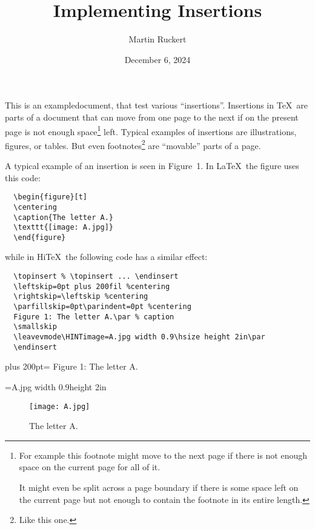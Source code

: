 \documentclass{article}
\title{Implementing Insertions}
\author{Martin Ruckert}
\date{December 6, 2024}
\begin{document}
\maketitle

This is an exampledocument, that test various ``insertions''.
Insertions in \TeX\ are parts of a document that can move from
one page to the next if on the present page is not enough
space\footnote{For example this footnote might move to the
next page if there is not enough space on the current page for
all of it.\par
It might even be split across a page boundary if there is some
space left on the current page but not enough to contain the
footnote in its entire length.} left. Typical examples of insertions
are illustrations, figures, or tables. 
But even footnotes\footnote{Like this one.} are ``movable'' parts of a page.

A typical example of an insertion is seen in Figure~1.
In \LaTeX\ the figure uses this code:
\begin{verbatim}
  \begin{figure}[t]
  \centering
  \caption{The letter A.}
  \texttt{[image: A.jpg]}
  \end{figure}
\end{verbatim}
while in Hi\TeX\ the following code has a similar effect:
\begin{verbatim}
  \topinsert % \topinsert ... \endinsert
  \leftskip=0pt plus 200fil %centering
  \rightskip=\leftskip %centering
  \parfillskip=0pt\parindent=0pt %centering
  Figure 1: The letter A.\par % caption
  \smallskip
  \leavevmode\HINTimage=A.jpg width 0.9\hsize height 2in\par
  \endinsert
\end{verbatim}

\ifhint
  \topinsert
    \leftskip=0pt plus 200pt\rightskip=\leftskip%
    \parfillskip=0pt\parindent=0pt%
     Figure 1: The letter A.\par%
     \label{letterA}
     \smallskip
     \leavevmode\HINTimage=A.jpg width 0.9\hsize height 2in\par
  \endinsert
\else
  \begin{figure}[t]
  \centering
  \texttt{[image: A.jpg]}
  \caption{The letter A.}
  \end{figure}
\fi
   
\end{document}
